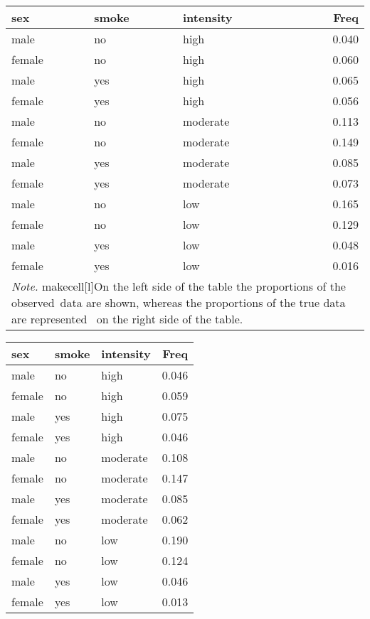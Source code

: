 \documentclass[
]{article}
\begin{document}
\begin{table}
\caption{\label{tab:cat}proportion table of categorical in observed  and true data}
\begin{table}

\centering
\begin{tabular}[t]{l|l|l|r}
\hline
sex & smoke & intensity & Freq\\
\hline
male & no & high & 0.040\\
\hline
female & no & high & 0.060\\
\hline
male & yes & high & 0.065\\
\hline
female & yes & high & 0.056\\
\hline
male & no & moderate & 0.113\\
\hline
female & no & moderate & 0.149\\
\hline
male & yes & moderate & 0.085\\
\hline
female & yes & moderate & 0.073\\
\hline
male & no & low & 0.165\\
\hline
female & no & low & 0.129\\
\hline
male & yes & low & 0.048\\
\hline
female & yes & low & 0.016\\
\hline
\multicolumn{4}{l}{\rule{0pt}{1em}\textit{Note.} makecell[l]{On the left side of the table the proportions of the observed\    data are shown, whereas the proportions of the true data are represented \    on the right side of the table.}}\\
\end{tabular}
\end{table}\begin{table}

\centering
\begin{tabular}[t]{l|l|l|r}
\hline
sex & smoke & intensity & Freq\\
\hline
male & no & high & 0.046\\
\hline
female & no & high & 0.059\\
\hline
male & yes & high & 0.075\\
\hline
female & yes & high & 0.046\\
\hline
male & no & moderate & 0.108\\
\hline
female & no & moderate & 0.147\\
\hline
male & yes & moderate & 0.085\\
\hline
female & yes & moderate & 0.062\\
\hline
male & no & low & 0.190\\
\hline
female & no & low & 0.124\\
\hline
male & yes & low & 0.046\\
\hline
female & yes & low & 0.013\\
\hline
\end{tabular}
\end{table}
\end{table}
\end{document}
